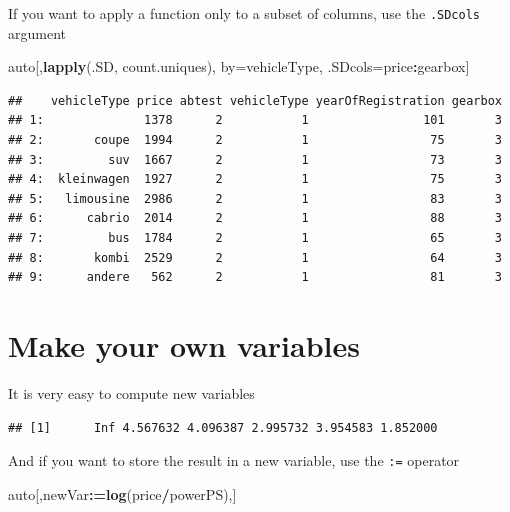 \documentclass[]{book}
\newenvironment{Shaded}{\begin{snugshade}}{\end{snugshade}}
\newcommand{\KeywordTok}[1]{\textcolor[rgb]{0.13,0.29,0.53}{\textbf{#1}}}
\newcommand{\StringTok}[1]{\textcolor[rgb]{0.31,0.60,0.02}{#1}}
\newcommand{\CommentTok}[1]{\textcolor[rgb]{0.56,0.35,0.01}{\textit{#1}}}
\newcommand{\OperatorTok}[1]{\textcolor[rgb]{0.81,0.36,0.00}{\textbf{#1}}}
\newcommand{\ErrorTok}[1]{\textcolor[rgb]{0.64,0.00,0.00}{\textbf{#1}}}
\newcommand{\NormalTok}[1]{#1}
\theoremstyle{definition}
\theoremstyle{definition}
\theoremstyle{definition}
\theoremstyle{remark}
\begin{document}
If you want to apply a function only to a subset of columns, use the
\texttt{.SDcols} argument

\begin{Shaded}
\begin{Highlighting}[]
\NormalTok{auto[,}\KeywordTok{lapply}\NormalTok{(.SD, count.uniques), by=vehicleType, .SDcols=price}\OperatorTok{:}\NormalTok{gearbox]}
\end{Highlighting}
\end{Shaded}

\begin{verbatim}
##    vehicleType price abtest vehicleType yearOfRegistration gearbox
## 1:              1378      2           1                101       3
## 2:       coupe  1994      2           1                 75       3
## 3:         suv  1667      2           1                 73       3
## 4:  kleinwagen  1927      2           1                 75       3
## 5:   limousine  2986      2           1                 83       3
## 6:      cabrio  2014      2           1                 88       3
## 7:         bus  1784      2           1                 65       3
## 8:       kombi  2529      2           1                 64       3
## 9:      andere   562      2           1                 81       3
\end{verbatim}

\section{Make your own variables}\label{make-your-own-variables}

It is very easy to compute new variables

\begin{Shaded}
\end{Shaded}

\begin{verbatim}
## [1]      Inf 4.567632 4.096387 2.995732 3.954583 1.852000
\end{verbatim}

And if you want to store the result in a new variable, use the
\texttt{:=} operator

\begin{Shaded}
\begin{Highlighting}[]
\NormalTok{auto[,newVar}\OperatorTok{:}\ErrorTok{=}\KeywordTok{log}\NormalTok{(price}\OperatorTok{/}\NormalTok{powerPS),]}
\end{Highlighting}
\end{Shaded}
\end{document}

